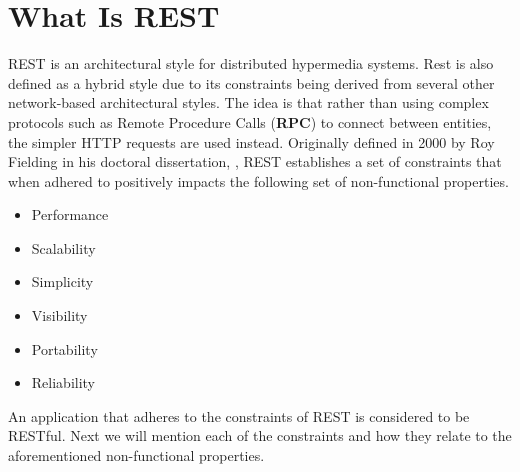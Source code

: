 \section{What Is REST}
REST is an architectural style for distributed hypermedia systems.
Rest is also defined as a hybrid style due to its constraints being derived from several other network-based architectural styles.
The idea is that rather than using complex protocols such as Remote Procedure Calls (\textbf{RPC}) to connect between entities, the simpler HTTP requests are used instead.
Originally defined in 2000 by Roy Fielding in his doctoral dissertation, \citep{fielding2000rest}, REST establishes a set of constraints that when adhered to positively impacts the following set of non-functional properties.
\begin{itemize}
    \item Performance
    \item Scalability
    \item Simplicity
    \item Visibility
    \item Portability
    \item Reliability
\end{itemize}
An application that adheres to the constraints of REST is considered to be RESTful.
Next we will mention each of the constraints and how they relate to the aforementioned non-functional properties.

